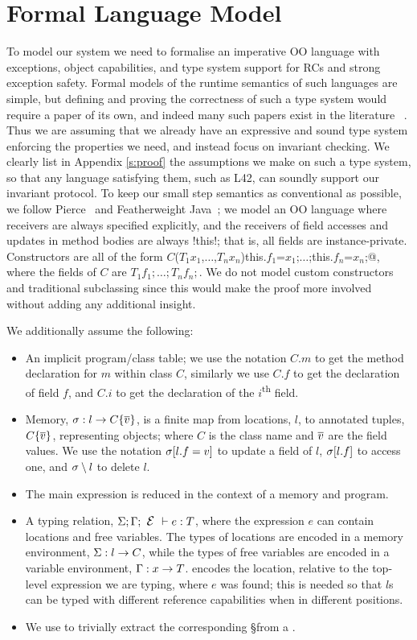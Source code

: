 \section{Formal Language Model}
\label{s:formalism}
To model our system we need to formalise an imperative OO language
with exceptions, object capabilities, and type system
support for RCs and strong exception safety.
Formal models of the runtime semantics of such languages are simple, but 
defining and proving the correctness of such a type system would require a paper
of its own, and indeed many such papers exist in the literature%
~\cite{ServettoEtAl13a,ServettoZucca15,GordonEtAl12,clebsch2015deny,JOT:issue_2011_01/article1}.
Thus we are assuming that we already have an expressive and sound type system enforcing the properties we need, and instead focus on invariant checking.
We clearly list in Appendix \ref{s:proof} the assumptions we make on such a type system, so that any language satisfying them, such as L42, can soundly support our invariant protocol.
To keep our small step semantics as conventional as possible, we follow Pierce~\cite{pierce2002types} and Featherweight Java~\cite{IgarashiEtAl01};
we model an OO language where receivers are always specified explicitly,
 and the receivers of field accesses and updates in method bodies are always \Q!this!; that is, all fields are instance-private.
Constructors are all of the form \Q@$C$($T_1 x_1$,$\ldots$,$T_n x_n$){this.$f_1$=$x_1$;$\ldots$;this.$f_n$=$x_n$;}@, where the fields of $C$ are $T_1 f_1;\ldots; T_n f_n;$.
We do not model custom constructors and traditional subclassing since this would make the proof more involved without adding any additional insight.

We additionally assume the following:
\begin{itemize}
	\item An implicit program/class table; we use the notation $C.m$ to get the method declaration for $m$ within class $C$, similarly we use $C.f$ to get the declaration of field $f$, and $C.i$ to get the declaration of the $i$\textsuperscript{th} field.
	\item Memory, $\s : l\rightarrow C\{\Many{v}\}${, is} a finite map from locations, $l$, to annotated tuples, $C\{\Many{v}\}$, representing objects; where $C$ is the class name and $\Many{v}$ are the field values.
	We use the notation $\s[l.f=v]$ to update a field of $l$, $\s[l.f]$ to access one, and $\s \setminus l$ to delete $l$.
	\item The main expression is reduced in the context of a memory and program.
	\item A typing relation, $\S;\G;\E\vdash e:T$, where 
	the expression $e$ can contain locations and free variables. The types of locations are encoded in 
a memory environment, 
$\S : l\rightarrow C$,
	while the types of free variables are encoded in
a variable environment, $\G : x\rightarrow T$. \E encodes the location, relative to the top-level expression we are typing, where $e$ was found; this is needed so that $l$s can be typed with different reference capabilities when in different positions.
	\item We use \Ss to trivially extract the corresponding \S from a \s.
\end{itemize}

